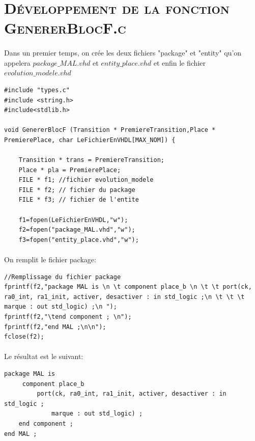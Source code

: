 \section{\textsc{Développement de la fonction GenererBlocF.c}}

\paragraph{} Dans un premier temps, on crée les deux fichiers "package" et "entity" qu'on appelera $ package\_MAL.vhd $ et $entity\_place.vhd$ et enfin le fichier $evolution\_modele.vhd$\\[0.25 cm]

\begin{lstlisting}
#include "types.c"
#include <string.h>
#include<stdlib.h>

void GenererBlocF (Transition * PremiereTransition,Place * PremierePlace, char LeFichierEnVHDL[MAX_NOM]) {

	Transition * trans = PremiereTransition;
   	Place * pla = PremierePlace;
	FILE * f1; //fichier evolution_modele
	FILE * f2; // fichier du package
	FILE * f3; // fichier de l'entite
	
	f1=fopen(LeFichierEnVHDL,"w");
	f2=fopen("package_MAL.vhd","w");
	f3=fopen("entity_place.vhd","w");
\end{lstlisting}

\paragraph{} On remplit le fichier package:\\[0.25 cm]

\begin{lstlisting}
//Remplissage du fichier package	
fprintf(f2,"package MAL is \n \t component place_b \n \t \t port(ck, ra0_int, ra1_init, activer, desactiver : in std_logic ;\n \t \t \t marque : out std_logic) ;\n ");
fprintf(f2,"\tend component ; \n");
fprintf(f2,"end MAL ;\n\n");
fclose(f2);
\end{lstlisting}

\paragraph{} Le résultat est le suivant:\\[0.25 cm]

\begin{lstlisting}[style=vhdl]
package MAL is 
 	 component place_b 
 	 	 port(ck, ra0_int, ra1_init, activer, desactiver : in std_logic ;
 	 	 	 marque : out std_logic) ;
 	end component ; 
end MAL ;
\end{lstlisting}


